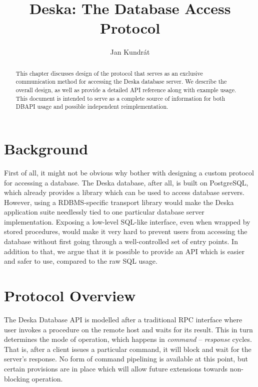 \documentclass{article}
\begin{document}
\title{Deska: The Database Access Protocol}

\author{Jan Kundrát}

\maketitle

\newcommand{\deskaFuncRef}[1]{{\tt {#1}}}

\begin{abstract}
This chapter discusses design of the protocol that serves as an exclusive communication method for accessing the Deska
database server.  We describe the overall design, as well as provide a detailed API reference along with example usage.
This document is intended to serve as a complete source of information for both DBAPI usage and possible independent
reimplementation.
\end{abstract}

\section{Background}

First of all, it might not be obvious why bother with designing a custom protocol for accessing a database.  The Deska
database, after all, is built on PostgreSQL, which already provides a library which can be used to access database
servers.  However, using a RDBMS-specific transport library would make the Deska application suite needlessly tied to
one particular database server implementation.  Exposing a low-level SQL-like interface, even when wrapped by stored
procedures, would make it very hard to prevent users from accessing the database without first going through a
well-controlled set of entry points.  In addition to that, we argue that it is possible to provide an API which is
easier and safer to use, compared to the raw SQL usage.

\section{Protocol Overview}

The Deska Database API is modelled after a traditional RPC interface where user invokes a procedure on the remote host
and waits for its result.  This in turn determines the mode of operation, which happens in {\em command} -- {\em
response} cycles.  That is, after a client issues a particular command, it will block and wait for the server's
response.  No form of command pipelining is available at this point, but certain provisions are in place which will
allow future extensions towards non-blocking operation.
\end{document}
